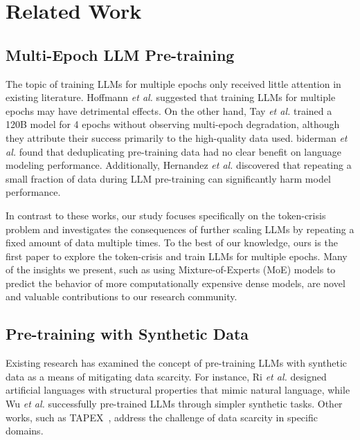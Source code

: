 \documentclass{article}
\begin{document}

\newpage

\section{Related Work}




\subsection{Multi-Epoch LLM Pre-training}

The topic of training LLMs for multiple epochs only received little attention in existing literature. Hoffmann \textit{et al.} \cite{hoffmann2022training} suggested that training LLMs for multiple epochs may have detrimental effects. On the other hand, Tay \textit{et al.} \cite{tay2022unifying} trained a 120B model for 4 epochs without observing multi-epoch degradation, although they attribute their success primarily to the high-quality data used. biderman \textit{et al.} \cite{biderman2023pythia} found that deduplicating pre-training data had no clear benefit on language modeling performance. Additionally, Hernandez \textit{et al.} \cite{hernandez2022scaling} discovered that repeating a small fraction of data during LLM pre-training can significantly harm model performance.

In contrast to these works, our study focuses specifically on the token-crisis problem and investigates the consequences of further scaling LLMs by repeating a fixed amount of data multiple times. To the best of our knowledge, ours is the first paper to explore the token-crisis and train LLMs for multiple epochs. Many of the insights we present, such as using Mixture-of-Experts (MoE) models to predict the behavior of more computationally expensive dense models, are novel and valuable contributions to our research community.

\subsection{Pre-training with Synthetic Data}

Existing research has examined the concept of pre-training LLMs with synthetic data as a means of mitigating data scarcity. For instance, Ri \textit{et al.} \cite{ri-tsuruoka-2022-pretraining} designed artificial languages with structural properties that mimic natural language, while Wu \textit{et al.} \cite{NEURIPS2022_89379d5f} successfully pre-trained LLMs through simpler synthetic tasks. Other works, such as TAPEX~\citep{liu2021tapex}, address the challenge of data scarcity in specific domains.
\end{document}
